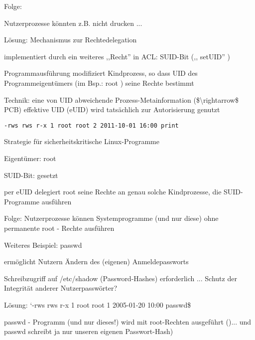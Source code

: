\documentclass[a4paper]{article}
\begin{document}
\begin{multicols}{3}
    Folge:

    \begin{itemize*}
        \item
        Nutzerprozesse könnten z.B. nicht drucken ...
    \end{itemize*}

    Lösung: Mechanismus zur Rechtedelegation

    \begin{itemize*}
        \item
        implementiert durch ein weiteres ,,Recht'' in ACL: SUID-Bit (,,
        setUID'' )
        \item
        Programmausführung modifiziert Kindprozess, so dass UID des
        Programmeigentümers (im Bsp.: root ) seine Rechte bestimmt
        \item
        Technik: eine von UID abweichende Prozess-Metainformation
        (\$\textbackslash rightarrow\$ PCB) effektive UID (eUID) wird
        tatsächlich zur Autorisierung genutzt
        \item
        \texttt{-rws\ rws\ r-x\ 1\ root\ root\ 2\ 2011-10-01\ 16:00\ print}
    \end{itemize*}

    Strategie für sicherheitskritische Linux-Programme

    \begin{itemize*}
        \item
        Eigentümer: root
        \item
        SUID-Bit: gesetzt
        \item
        per eUID delegiert root seine Rechte an genau solche Kindprozesse, die
        SUID-Programme ausführen
        \item
        Folge: Nutzerprozesse können Systemprogramme (und nur diese) ohne
        permanente root - Rechte ausführen
    \end{itemize*}

    Weiteres Beispiel: passwd

    \begin{itemize*}
        \item
        ermöglicht Nutzern Ändern des (eigenen) Anmeldepassworts
        \item
        Schreibzugriff auf /etc/shadow (Password-Hashes) erforderlich ...
        Schutz der Integrität anderer Nutzerpasswörter?
        \item
        Lösung: `-rws rws r-x 1 root root 1 2005-01-20 10:00 passwd\$
        \item
        passwd - Programm (und nur dieses!) wird mit root-Rechten ausgeführt
        ()... und passwd schreibt ja nur unseren eigenen Passwort-Hash)
    \end{itemize*}



\end{multicols}
\end{document}
